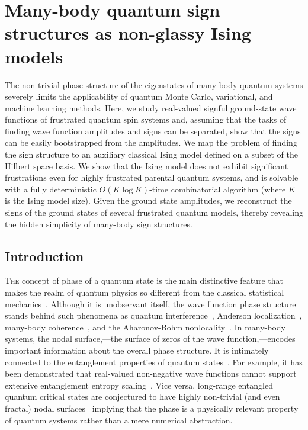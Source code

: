 \openleft%
\chapter{Many-body quantum sign structures as non-glassy Ising models}\label{ch:cp23}

{\small The non-trivial phase structure of the eigenstates of many-body quantum systems severely limits the applicability of quantum Monte Carlo, variational, and machine learning methods. Here, we study real-valued signful ground-state wave functions of frustrated quantum spin systems and, assuming that the tasks of finding wave function amplitudes and signs can be separated, show that the signs can be easily bootstrapped from the amplitudes. We map the problem of finding the sign structure to an auxiliary classical Ising model defined on a subset of the Hilbert space basis. We show that the Ising model does not exhibit significant frustrations even for highly frustrated parental quantum systems, and is solvable with a fully deterministic $O(K\log K)$-time combinatorial algorithm (where $K$ is the Ising model size). Given the ground state amplitudes, we reconstruct the signs of the ground states of several frustrated quantum models, thereby revealing the hidden simplicity of many-body sign structures.}

\clearpage

\section{Introduction}

\lettrine[lines=3]{T}{he} concept of phase of a quantum state is the main distinctive feature that makes the realm of quantum physics so different from the classical statistical mechanics~\cite{quantum_phase}. Although it is unobservant itself, the wave function phase structure stands behind such phenomena as quantum interference~\cite{interference}, Anderson localization~\cite{localization}, many-body coherence~\cite{coherence}, and the Aharonov-Bohm nonlocality~\cite{Aharonov-Bohm,olariu}. In many-body systems, the nodal surface,---the surface of zeros of the wave function,---encodes important information about the overall phase structure. It is intimately connected to the entanglement properties of quantum states~\cite{Kaplis}. For example, it has been demonstrated that real-valued non-negative wave functions cannot support extensive entanglement entropy scaling~\cite{Grover}. Vice versa, long-range entangled quantum critical states are conjectured to have highly non-trivial (and even fractal) nodal surfaces~\cite{fractals} implying that the phase is a physically relevant property of quantum systems rather than a mere numerical abstraction.

